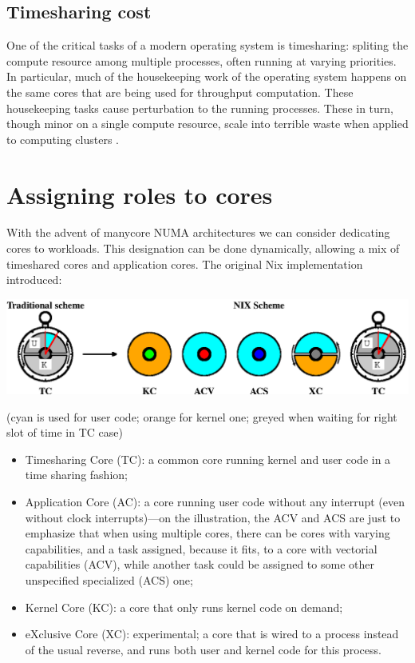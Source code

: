 \documentclass{article}
\begin{document}
\subsection{Timesharing cost}
One of the critical tasks of a modern operating system is timesharing: spliting the compute resource among multiple processes, often running at varying priorities.
In particular, much of the housekeeping work of the operating system happens on the same cores that are being used for throughput computation.
These housekeeping tasks cause perturbation to the running processes.
These in turn, though minor on a single compute resource, scale into terrible waste when applied to computing clusters \cite{Petrini2003}.

\section{Assigning roles to cores}
With the advent of manycore NUMA architectures we can consider dedicating cores to workloads.
This designation can be done dynamically, allowing a mix of timeshared cores and application cores.
The original Nix implementation introduced:

\noindent
\includegraphics{nix_fig.eps}

\noindent
{\hfil(cyan is used for user code; orange for kernel one; greyed when waiting for right slot of time in TC case)\hfil}
\begin{itemize}
\item Timesharing Core (TC): a common core running kernel and user code in a time sharing fashion;
\item Application Core (AC): a core running user code without any interrupt (even without clock interrupts)---on the illustration, the ACV and ACS are just to emphasize that when using multiple cores, there can be cores with varying capabilities, and a task assigned, because it fits, to a core with vectorial capabilities (ACV), while another task could be assigned to some other unspecified specialized (ACS) one;\item Kernel Core (KC): a core that only runs kernel code on demand;
\item eXclusive Core (XC): experimental; a core that is wired to a process instead of the usual reverse, and runs both user and kernel code for this process.
\end{itemize}
\end{document}
